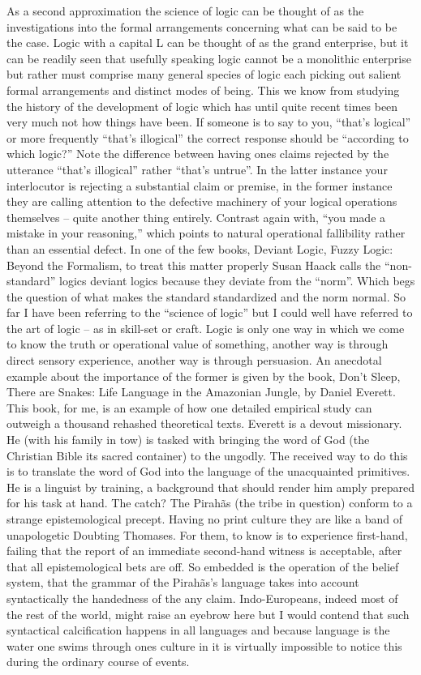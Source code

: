 \documentclass[dah,phd,a4paper]{xe_uccthesis}
\begin{document}
As a second approximation the science of logic can be thought of as the investigations into the formal arrangements concerning what can be said to be the case. Logic with a capital L can be thought of as the grand enterprise, but it can be readily seen that usefully speaking logic cannot be a monolithic enterprise but rather must comprise many general species of logic each picking out salient formal arrangements and distinct modes of being. This we know from studying the history of the development of logic which has until quite recent times been very much not how things have been. If someone is to say to you, “that's logical” or more frequently “that's illogical” the correct response should be “according to which logic?” Note the difference between having ones claims rejected by the utterance “that's illogical” rather “that's untrue”. In the latter instance your interlocutor is rejecting a substantial claim or premise, in the former instance they are calling attention to the defective machinery of your logical operations themselves – quite another thing entirely. Contrast again with, “you made a mistake in your reasoning,” which points to natural operational fallibility rather than an essential defect.
In one of the few books, Deviant Logic, Fuzzy Logic: Beyond the Formalism, to treat this matter properly Susan Haack calls the “non-standard” logics deviant logics because they deviate from the “norm”. Which begs the question of what makes the standard standardized and the norm normal.
So far I have been referring to the “science of logic” but I could well have referred to the art of logic – as in skill-set or craft. Logic is only one way in which we come to know the truth or operational value of something, another way is through direct sensory experience, another way is through persuasion. An anecdotal example about the importance of the former is given by the book, Don't Sleep, There are Snakes: Life Language in the Amazonian Jungle, by Daniel Everett. This book, for me, is an example of how one detailed empirical study can outweigh a thousand rehashed theoretical texts. Everett is a devout missionary. He (with his family in tow) is tasked with bringing the word of God (the Christian Bible its sacred container) to the ungodly. The received way to do this is to translate the word of God into the language of the unacquainted primitives. He is a linguist by training, a background that should render him amply prepared for his task at hand. The catch? The Pirahãs (the tribe in question) conform to a strange epistemological precept. Having no print culture they are like a band of unapologetic Doubting Thomases. For them, to know is to experience first-hand, failing that the report of an immediate second-hand witness is acceptable, after that all epistemological bets are off. So embedded is the operation of the belief system, that the grammar of the Pirahãs's language takes into account syntactically the handedness of the any claim. Indo-Europeans, indeed most of the rest of the world, might raise an eyebrow here but I would contend that such syntactical calcification happens in all languages and because language is the water one swims through ones culture in it is virtually impossible to notice this during the ordinary course of events.
\end{document}
